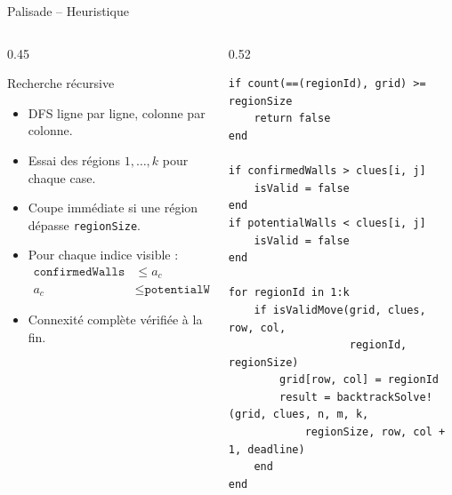\documentclass[11pt,aspectratio=169]{beamer}
\begin{document}
\begin{frame}[fragile]{Palisade -- Heuristique}
\small
\begin{columns}[T,onlytextwidth]
\begin{column}{0.45\textwidth}
\begin{block}{Recherche récursive}
\begin{itemize}
  \item DFS ligne par ligne, colonne par colonne.
  \item Essai des régions \(1,\dots,k\) pour chaque case.
  \item Coupe immédiate si une région dépasse \texttt{regionSize}.
  \item Pour chaque indice visible :
  \[
  \begin{aligned}
  \texttt{confirmedWalls}&\le a_c\\
  a_c&\le \texttt{potentialWalls}
  \end{aligned}
  \]
  \item Connexité complète vérifiée à la fin.
\end{itemize}
\end{block}
\end{column}
\begin{column}{0.52\textwidth}
\begin{lstlisting}[basicstyle=\ttfamily\tiny]
if count(==(regionId), grid) >= regionSize
    return false
end

if confirmedWalls > clues[i, j]
    isValid = false
end
if potentialWalls < clues[i, j]
    isValid = false
end

for regionId in 1:k
    if isValidMove(grid, clues, row, col,
                   regionId, regionSize)
        grid[row, col] = regionId
        result = backtrackSolve!(grid, clues, n, m, k,
            regionSize, row, col + 1, deadline)
    end
end
\end{lstlisting}
\end{column}
\end{columns}
\end{frame}
\end{document}

